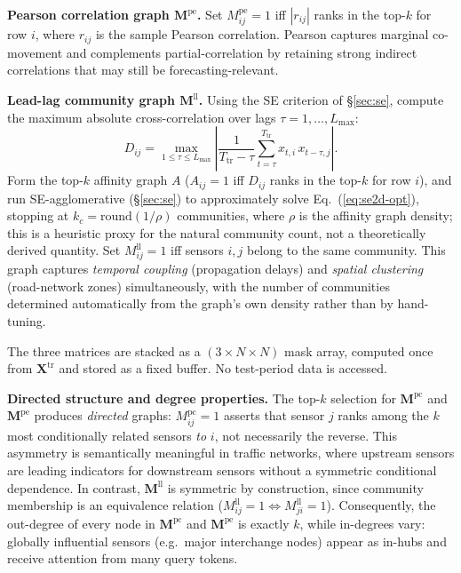 \documentclass[letterpaper]{article}   %
\begin{document}
\textbf{Pearson correlation graph $\mathbf{M}^{\text{pe}}$.}
Set $M^{\text{pe}}_{ij}{=}1$ iff $|r_{ij}|$ ranks in the top-$k$ for row $i$,
where $r_{ij}$ is the sample Pearson correlation.
Pearson captures marginal co-movement and complements partial-correlation by
retaining strong indirect correlations that may still be forecasting-relevant.

\textbf{Lead-lag community graph $\mathbf{M}^{\text{ll}}$.}
Using the SE criterion of §\ref{sec:se}, compute the maximum absolute cross-correlation
over lags $\tau{=}1,\ldots,L_{\max}$:
\begin{equation}
D_{ij} = \max_{1\le\tau\le L_{\max}}
\left|\frac{1}{T_{\text{tr}}-\tau}
\sum_{t=\tau}^{T_{\text{tr}}}x_{t,i}\,x_{t-\tau,j}\right|.
\end{equation}
Form the top-$k$ affinity graph $A$ ($A_{ij}{=}1$ iff $D_{ij}$ ranks in the top-$k$
for row $i$), and run SE-agglomerative (§\ref{sec:se}) to approximately solve Eq.~(\ref{eq:se2d-opt}),
stopping at $k_c{=}\mathrm{round}(1/\rho)$ communities, where $\rho$ is the affinity
graph density; this is a heuristic proxy for the natural community count, not a theoretically derived quantity.
Set $M^{\text{ll}}_{ij}{=}1$ iff sensors $i,j$ belong to the same community.
This graph captures \emph{temporal coupling} (propagation delays) and
\emph{spatial clustering} (road-network zones) simultaneously, with the number of
communities determined automatically from the graph's own density rather than by
hand-tuning.

The three matrices are stacked as a $(3{\times}N{\times}N)$ mask array, computed
once from $\mathbf{X}^{\text{tr}}$ and stored as a fixed buffer. No test-period
data is accessed.

\textbf{Directed structure and degree properties.}
The top-$k$ selection for $\mathbf{M}^{\text{pc}}$ and $\mathbf{M}^{\text{pe}}$
produces \emph{directed} graphs: $M^{\text{pc}}_{ij}{=}1$ asserts that sensor $j$
ranks among the $k$ most conditionally related sensors \emph{to} $i$, not necessarily
the reverse.
This asymmetry is semantically meaningful in traffic networks, where upstream sensors
are leading indicators for downstream sensors without a symmetric conditional dependence.
In contrast, $\mathbf{M}^{\text{ll}}$ is symmetric by construction, since community
membership is an equivalence relation
($M^{\text{ll}}_{ij}{=}1 \Leftrightarrow M^{\text{ll}}_{ji}{=}1$).
Consequently, the out-degree of every node in $\mathbf{M}^{\text{pc}}$ and
$\mathbf{M}^{\text{pe}}$ is exactly $k$, while in-degrees vary: globally influential
sensors (e.g.\ major interchange nodes) appear as in-hubs and receive attention from
many query tokens.
\end{document}
